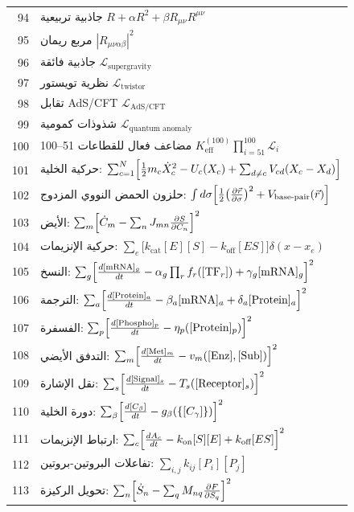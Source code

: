 \documentclass[11pt,a4paper]{article}
\begin{document}
\begin{longtable}{r l}
		94 & جاذبية تربيعية \(R + \alpha R^2 + \beta R_{\mu\nu}R^{\mu\nu}\) \\
		95 & مربع ريمان \(|R_{\mu\nu\alpha\beta}|^2\) \\
		96 & جاذبية فائقة \(\mathcal{L}_{\text{supergravity}}\) \\
		97 & نظرية تويستور \(\mathcal{L}_{\text{twistor}}\) \\
		98 & تقابل AdS/CFT \(\mathcal{L}_{\text{AdS/CFT}}\) \\
		99 & شذوذات كمومية \(\mathcal{L}_{\text{quantum anomaly}}\) \\
		100 & مضاعف فعال للقطاعات 51–100 \(K^{(100)}_{\mathrm{eff}}\prod_{i=51}^{100}\mathcal{L}_i\) \\
		101 & حركية الخلية: $\sum_{c=1}^{N}\Bigl[\frac12 m_c\dot X_c^2 - U_c(X_c) + \sum_{d\neq c}V_{cd}(X_c-X_d)\Bigr]$ \\
		102 & حلزون الحمض النووي المزدوج: $\int d\sigma\Bigl[\frac12\bigl(\frac{\partial\vec r}{\partial\sigma}\bigr)^2 + V_{\text{base-pair}}(\vec r)\Bigr]$ \\
		103 & الأيض: $\sum_m\Bigl[\dot C_m - \sum_n J_{mn}\frac{\partial S}{\partial C_n}\Bigr]^2$ \\
		104 & حركية الإنزيمات: $\sum_e\bigl[k_{\text{cat}}[E][S] - k_{\text{off}}[ES]\bigr]\delta(x-x_e)$ \\
		105 & النسخ: $\sum_g\Bigl[\frac{d[\text{mRNA}]_g}{dt} - \alpha_g\prod_r f_r([\text{TF}_r]) + \gamma_g[\text{mRNA}]_g\Bigr]^2$ \\
		106 & الترجمة: $\sum_a\Bigl[\frac{d[\text{Protein}]_a}{dt} - \beta_a[\text{mRNA}]_a + \delta_a[\text{Protein}]_a\Bigr]^2$ \\
		107 & الفسفرة: $\sum_p\Bigl[\frac{d[\text{Phospho}]_p}{dt} - \eta_p([\text{Protein}]_p)\Bigr]^2$ \\
		108 & التدفق الأيضي: $\sum_m\Bigl[\frac{d[\text{Met}]_m}{dt} - v_m([\text{Enz}],[\text{Sub}])\Bigr]^2$ \\
		109 & نقل الإشارة: $\sum_s\Bigl[\frac{d[\text{Signal}]_s}{dt} - T_s([\text{Receptor}]_s)\Bigr]^2$ \\
		110 & دورة الخلية: $\sum_\beta\Bigl[\frac{d[C_\beta]}{dt} - g_\beta(\{[C_\gamma]\})\Bigr]^2$ \\
		111 & ارتباط الإنزيمات: $\sum_c\Bigl[\frac{dA_c}{dt} - k_{\text{on}}[S][E] + k_{\text{off}}[ES]\Bigr]^2$ \\
		112 & تفاعلات البروتين-بروتين: $\sum_{i,j}k_{ij}[P_i][P_j]$ \\
		113 & تحويل الركيزة: $\sum_n\Bigl[\dot S_n - \sum_q M_{nq}\frac{\partial F}{\partial S_q}\Bigr]^2$ \\

\end{longtable}
\end{document}
